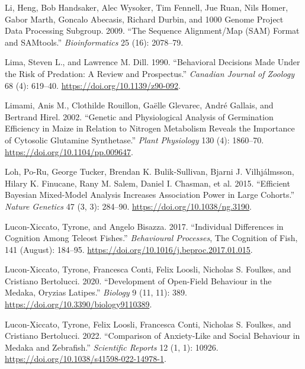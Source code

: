 \documentclass[
]{book}
\newlength{\cslhangindent}
\newlength{\cslentryspacingunit} %
\newenvironment{CSLReferences}[2] %
 {%
  \setlength{\parindent}{0pt}
  \ifodd #1
  \let\oldpar\par
  \def\par{\hangindent=\cslhangindent\oldpar}
  \fi
  \setlength{\parskip}{#2\cslentryspacingunit}
 }%
 {}
\begin{document}
\begin{CSLReferences}{1}{0}
\leavevmode{}%
Li, Heng, Bob Handsaker, Alec Wysoker, Tim Fennell, Jue Ruan, Nils Homer, Gabor Marth, Goncalo Abecasis, Richard Durbin, and 1000 Genome Project Data Processing Subgroup. 2009. {``The {Sequence} Alignment/Map ({SAM}) Format and {SAMtools}.''} \emph{Bioinformatics} 25 (16): 2078--79.

\leavevmode{}%
Lima, Steven L., and Lawrence M. Dill. 1990. {``Behavioral Decisions Made Under the Risk of Predation: A Review and Prospectus.''} \emph{Canadian Journal of Zoology} 68 (4): 619--40. \url{https://doi.org/10.1139/z90-092}.

\leavevmode{}%
Limami, Anis M., Clothilde Rouillon, Gaëlle Glevarec, André Gallais, and Bertrand Hirel. 2002. {``Genetic and {Physiological Analysis} of {Germination Efficiency} in {Maize} in {Relation} to {Nitrogen Metabolism Reveals} the {Importance} of {Cytosolic Glutamine Synthetase}.''} \emph{Plant Physiology} 130 (4): 1860--70. \url{https://doi.org/10.1104/pp.009647}.

\leavevmode{}%
Loh, Po-Ru, George Tucker, Brendan K. Bulik-Sullivan, Bjarni J. Vilhjálmsson, Hilary K. Finucane, Rany M. Salem, Daniel I. Chasman, et al. 2015. {``Efficient {Bayesian} Mixed-Model Analysis Increases Association Power in Large Cohorts.''} \emph{Nature Genetics} 47 (3, 3): 284--90. \url{https://doi.org/10.1038/ng.3190}.

\leavevmode{}%
Lucon-Xiccato, Tyrone, and Angelo Bisazza. 2017. {``Individual Differences in Cognition Among Teleost Fishes.''} \emph{Behavioural Processes}, The {Cognition} of {Fish}, 141 (August): 184--95. \url{https://doi.org/10.1016/j.beproc.2017.01.015}.

\leavevmode{}%
Lucon-Xiccato, Tyrone, Francesca Conti, Felix Loosli, Nicholas S. Foulkes, and Cristiano Bertolucci. 2020. {``Development of {Open-Field Behaviour} in the {Medaka}, {Oryzias} Latipes.''} \emph{Biology} 9 (11, 11): 389. \url{https://doi.org/10.3390/biology9110389}.

\leavevmode{}%
Lucon-Xiccato, Tyrone, Felix Loosli, Francesca Conti, Nicholas S. Foulkes, and Cristiano Bertolucci. 2022. {``Comparison of Anxiety-Like and Social Behaviour in Medaka and Zebrafish.''} \emph{Scientific Reports} 12 (1, 1): 10926. \url{https://doi.org/10.1038/s41598-022-14978-1}.


\end{CSLReferences}
\end{document}

